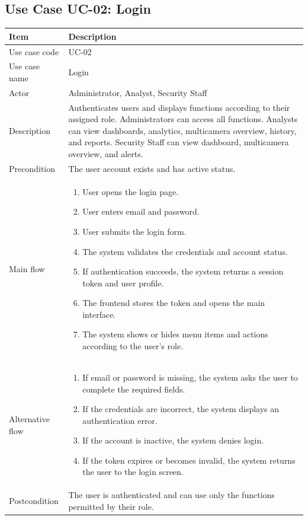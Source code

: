 \documentclass[12pt,a4paper]{report}
\begin{document}
\subsection{Use Case UC-02: Login}
\begin{longtable}{|p{3.6cm}|p{10.4cm}|}
\hline
\rowcolor{HeaderBlue}\textbf{Item} & \textbf{Description} \\
\hline
Use case code & UC-02 \\
\hline
Use case name & Login \\
\hline
Actor & Administrator, Analyst, Security Staff \\
\hline
Description & Authenticates users and displays functions according to their assigned role. Administrators can access all functions. Analysts can view dashboards, analytics, multicamera overview, history, and reports. Security Staff can view dashboard, multicamera overview, and alerts. \\
\hline
Precondition & The user account exists and has active status. \\
\hline
Main flow &
\begin{enumerate}
    \item User opens the login page.
    \item User enters email and password.
    \item User submits the login form.
    \item The system validates the credentials and account status.
    \item If authentication succeeds, the system returns a session token and user profile.
    \item The frontend stores the token and opens the main interface.
    \item The system shows or hides menu items and actions according to the user's role.
\end{enumerate} \\
\hline
Alternative flow &
\begin{enumerate}
    \item If email or password is missing, the system asks the user to complete the required fields.
    \item If the credentials are incorrect, the system displays an authentication error.
    \item If the account is inactive, the system denies login.
    \item If the token expires or becomes invalid, the system returns the user to the login screen.
\end{enumerate} \\
\hline
Postcondition & The user is authenticated and can use only the functions permitted by their role. \\
\hline
\end{longtable}
\end{document}
